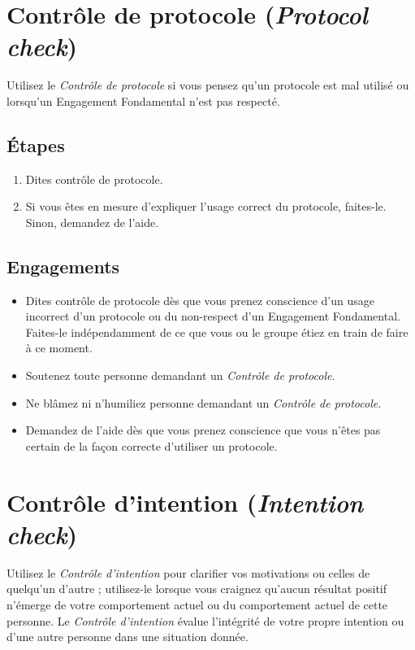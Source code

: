 \documentclass[paper=6in:9in,pagesize=pdftex,headinclude=on,footinclude=on,11pt]{scrbook}
\let\oldsection\section
\renewcommand\section{\clearpage\oldsection}
\begin{document}
\section{Contrôle de protocole (\emph{Protocol check})}

Utilisez le \emph{Contrôle de protocole} si vous pensez qu'un protocole est mal utilisé ou lorsqu'un Engagement Fondamental n'est pas
respecté.

\subsection{Étapes}
\begin{enumerate}
	\item Dites \og{}contrôle de protocole\fg{}.
	\item Si vous êtes en mesure d'expliquer l'usage correct du protocole, faites-le. Sinon, demandez de l'aide.
\end{enumerate}

\subsection{Engagements}
\begin{itemize}
	\item Dites \og{}contrôle de protocole\fg{} dès que vous prenez conscience d'un usage incorrect d'un protocole ou du non-respect
	      d'un Engagement Fondamental. Faites-le indépendamment de ce que vous ou le groupe étiez en train de faire à ce moment.
	\item Soutenez toute personne demandant un \emph{Contrôle de protocole}.
	\item Ne blâmez ni n'humiliez personne demandant un \emph{Contrôle de protocole}.
	\item Demandez de l'aide dès que vous prenez conscience que vous n'êtes pas certain de la façon correcte d'utiliser un protocole.
\end{itemize}

\section{Contrôle d'intention (\emph{Intention check})}

Utilisez le \emph{Contrôle d'intention} pour clarifier vos motivations ou celles de quelqu'un d'autre ; utilisez-le lorsque vous
craignez qu'aucun résultat positif n'émerge de votre comportement actuel ou du comportement actuel de cette personne. Le
\emph{Contrôle d'intention} évalue l'intégrité de votre propre intention ou d'une autre personne dans une situation donnée.
\end{document}
